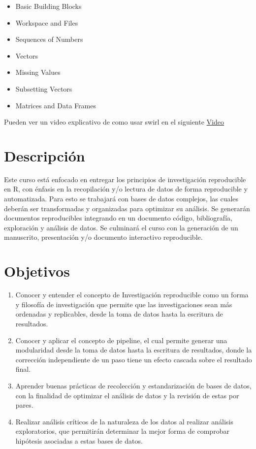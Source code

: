 \documentclass[]{book}
\providecommand{\tightlist}{%
  \setlength{\itemsep}{0pt}\setlength{\parskip}{0pt}}
\begin{document}
\begin{itemize}
\tightlist
\item
  Basic Building Blocks
\item
  Workspace and Files
\item
  Sequences of Numbers
\item
  Vectors
\item
  Missing Values
\item
  Subsetting Vectors
\item
  Matrices and Data Frames
\end{itemize}

Pueden ver un video explicativo de como usar swirl en el siguiente
\href{https://youtu.be/w6L7Ye18yPE}{Video}

\hypertarget{descripcion}{%
\section{Descripción}\label{descripcion}}

Este curso está enfocado en entregar los principios de investigación
reproducible en R, con énfasis en la recopilación y/o lectura de datos
de forma reproducible y automatizada. Para esto se trabajará con bases
de datos complejos, las cuales deberán ser transformadas y organizadas
para optimizar su análisis. Se generarán documentos reproducibles
integrando en un documento código, bibliografía, exploración y análisis
de datos. Se culminará el curso con la generación de un manuscrito,
presentación y/o documento interactivo reproducible.

\hypertarget{objetivos}{%
\section{Objetivos}\label{objetivos}}

\begin{enumerate}
\def\labelenumi{\arabic{enumi}.}
\item
  Conocer y entender el concepto de Investigación reproducible como un
  forma y filosofía de investigación que permite que las investigaciones
  sean más ordenadas y replicables, desde la toma de datos hasta la
  escritura de resultados.
\item
  Conocer y aplicar el concepto de pipeline, el cual permite generar una
  modularidad desde la toma de datos hasta la escritura de resultados,
  donde la corrección independiente de un paso tiene un efecto cascada
  sobre el resultado final.
\item
  Aprender buenas prácticas de recolección y estandarización de bases de
  datos, con la finalidad de optimizar el análisis de datos y la
  revisión de estas por pares.
\item
  Realizar análisis críticos de la naturaleza de los datos al realizar
  análisis exploratorios, que permitirán determinar la mejor forma de
  comprobar hipótesis asociadas a estas bases de datos.
\end{enumerate}
\end{document}
